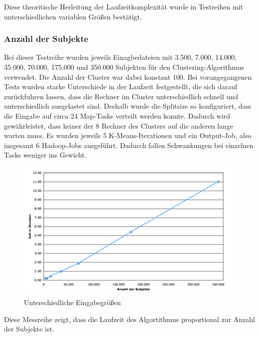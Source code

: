 \documentclass[a4paper]{llncs}
\begin{document}
Diese theoritische Herleitung der Laufzeitkomplexität wurde in Testreihen mit unterschiedlichen variablen Größen bestätigt.

\subsubsection{Anzahl der Subjekte}
Bei dieser Testreihe wurden jeweils Einagbedateien mit 3.500, 7.000, 14.000, 35.000, 70.000, 175.000 und 350.000 Subjekten für den Clustering-Algorithmus verwendet.
Die Anzahl der Cluster war dabei konstant 100.
Bei vorangegangenen Tests wurden starke Unterschiede in der Laufzeit festgestellt, die sich darauf zurückfuhren lassen, dass die Rechner im Cluster unterschiedlich schnell und unterschiedlich ausgelastet sind. Deshalb wurde die Splitsize so konfiguriert, dass die Eingabe auf circa 24 Map-Tasks verteilt werden konnte. Dadurch wird gewährleistet, dass keiner der 8 Rechner des Clusters auf die anderen lange warten muss.
Es wurden jeweils 5 K-Means-Iterationen und ein Output-Job, also insgesamt 6 Hadoop-Jobs ausgeführt. Dadurch fallen Schwankungen bei einzelnen Tasks weniger ins Gewicht.
\begin{figure}[!ht]
\centering
\includegraphics[width=0.99\textwidth]{charts/subjects.png}
\caption{Unterschiedliche Eingabegrößen}
\label{fig:subjects}
\end{figure}
Diese Messreihe zeigt, dass die Laufzeit des Algortithmus proportional zur Anzahl der Subjekte ist.
\end{document}
